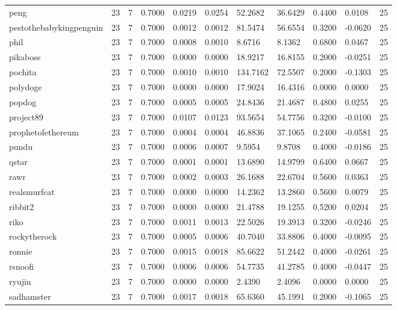 \begin{table}[htbp]
\begin{tabular}{lllllllllll}
peng & 23 & 7 & 0.7000 & 0.0219 & 0.0254 & 52.2682 & 36.6429 & 0.4400 & 0.0108 & 25 \\
pestothebabykingpenguin & 23 & 7 & 0.7000 & 0.0012 & 0.0012 & 81.5474 & 56.6554 & 0.3200 & -0.0620 & 25 \\
phil & 23 & 7 & 0.7000 & 0.0008 & 0.0010 & 8.6716 & 8.1362 & 0.6800 & 0.0467 & 25 \\
pikaboss & 23 & 7 & 0.7000 & 0.0000 & 0.0000 & 18.9217 & 16.8155 & 0.2000 & -0.0251 & 25 \\
pochita & 23 & 7 & 0.7000 & 0.0010 & 0.0010 & 134.7162 & 72.5507 & 0.2000 & -0.1303 & 25 \\
polydoge & 23 & 7 & 0.7000 & 0.0000 & 0.0000 & 17.9024 & 16.4316 & 0.0000 & 0.0000 & 25 \\
popdog & 23 & 7 & 0.7000 & 0.0005 & 0.0005 & 24.8436 & 21.4687 & 0.4800 & 0.0255 & 25 \\
project89 & 23 & 7 & 0.7000 & 0.0107 & 0.0123 & 93.5654 & 54.7756 & 0.3200 & -0.0100 & 25 \\
prophetofethereum & 23 & 7 & 0.7000 & 0.0004 & 0.0004 & 46.8836 & 37.1065 & 0.2400 & -0.0581 & 25 \\
pundu & 23 & 7 & 0.7000 & 0.0006 & 0.0007 & 9.5954 & 9.8708 & 0.4000 & -0.0186 & 25 \\
qstar & 23 & 7 & 0.7000 & 0.0001 & 0.0001 & 13.6890 & 14.9799 & 0.6400 & 0.0667 & 25 \\
rawr & 23 & 7 & 0.7000 & 0.0002 & 0.0003 & 26.1688 & 22.6704 & 0.5600 & 0.0363 & 25 \\
realsmurfcat & 23 & 7 & 0.7000 & 0.0000 & 0.0000 & 14.2362 & 13.2860 & 0.5600 & 0.0079 & 25 \\
ribbit2 & 23 & 7 & 0.7000 & 0.0000 & 0.0000 & 21.4788 & 19.1255 & 0.5200 & 0.0204 & 25 \\
riko & 23 & 7 & 0.7000 & 0.0011 & 0.0013 & 22.5026 & 19.3913 & 0.3200 & -0.0246 & 25 \\
rockytherock & 23 & 7 & 0.7000 & 0.0005 & 0.0006 & 40.7040 & 33.8806 & 0.4000 & -0.0095 & 25 \\
ronnie & 23 & 7 & 0.7000 & 0.0015 & 0.0018 & 85.6622 & 51.2442 & 0.4000 & -0.0261 & 25 \\
rsnoofi & 23 & 7 & 0.7000 & 0.0006 & 0.0006 & 54.7735 & 41.2785 & 0.4000 & -0.0447 & 25 \\
ryujin & 23 & 7 & 0.7000 & 0.0000 & 0.0000 & 2.4390 & 2.4096 & 0.0000 & 0.0000 & 25 \\
sadhamster & 23 & 7 & 0.7000 & 0.0017 & 0.0018 & 65.6360 & 45.1991 & 0.2000 & -0.1065 & 25 \\

\end{tabular}
\end{table}
